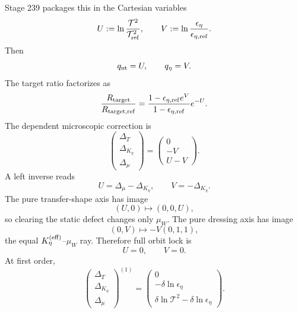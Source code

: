 Stage 239 packages this in the Cartesian variables
\begin{equation}
\label{eq:app-part07-uv-def}
U:=\ln\frac{\mathcal T^2}{\mathcal T_{\rm ref}^2},
\qquad
V:=\ln\frac{\epsilon_\eta}{\epsilon_{\eta,\rm ref}}.
\end{equation}
Then
\begin{equation}
\label{eq:app-part07-rm-packet-uv}
q_{\rm nt}=U,
\qquad
q_\eta=V.
\end{equation}
The target ratio factorizes as
\begin{equation}
\label{eq:app-part07-rtarget-uv}
\frac{R_{\rm target}}{R_{\rm target,ref}}
=
\frac{1-\epsilon_{\eta,\rm ref}e^V}{1-\epsilon_{\eta,\rm ref}}e^{-U}.
\end{equation}
The dependent microscopic correction is
\begin{equation}
\label{eq:app-part07-uv-dependent-correction}
\begin{pmatrix}\Delta_T\\\Delta_{K_\eta}\\\Delta_\mu\end{pmatrix}
=
\begin{pmatrix}0\\-V\\U-V\end{pmatrix}.
\end{equation}
A left inverse reads
\begin{equation}
\label{eq:app-part07-uv-left-inverse}
U=\Delta_\mu-\Delta_{K_\eta},
\qquad
V=-\Delta_{K_\eta}.
\end{equation}
The pure transfer-shape axis has image
\begin{equation}
\label{eq:app-part07-pure-transfer-image}
(U,0)
\longmapsto
(0,0,U),
\end{equation}
so clearing the static defect changes only \(\mu_W\).  The pure dressing axis has image
\begin{equation}
\label{eq:app-part07-pure-dressing-image}
(0,V)
\longmapsto
-V(0,1,1),
\end{equation}
the equal \(K_\eta^{(\rm eff)}\)--\(\mu_W\) ray.  Therefore full orbit lock is
\begin{equation}
\label{eq:app-part07-uv-orbit-lock}
U=0,
\qquad
V=0.
\end{equation}
At first order,
\begin{equation}
\label{eq:app-part07-uv-first-order-dependent}
\begin{pmatrix}\Delta_T\\\Delta_{K_\eta}\\\Delta_\mu\end{pmatrix}^{(1)}
=
\begin{pmatrix}
0\\
-\delta\ln\epsilon_\eta\\
\delta\ln\mathcal T^2-\delta\ln\epsilon_\eta
\end{pmatrix}.
\end{equation}

